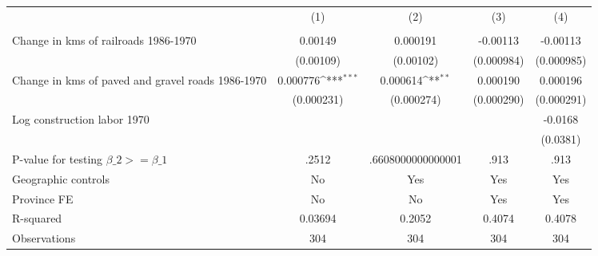 {
\def\sym#1{\ifmmode^{#1}\else\(^{#1}\)\fi}
\begin{tabular}{l*{4}{c}}
\hline\hline
                &\multicolumn{1}{c}{(1)}&\multicolumn{1}{c}{(2)}&\multicolumn{1}{c}{(3)}&\multicolumn{1}{c}{(4)}\\
                &\multicolumn{1}{c}{}&\multicolumn{1}{c}{}&\multicolumn{1}{c}{}&\multicolumn{1}{c}{}\\
\hline
Change in kms of railroads 1986-1970&  0.00149         & 0.000191         & -0.00113         & -0.00113         \\
                &(0.00109)         &(0.00102)         &(0.000984)         &(0.000985)         \\
[1em]
Change in kms of paved and gravel roads 1986-1970& 0.000776\sym{***}& 0.000614\sym{**} & 0.000190         & 0.000196         \\
                &(0.000231)         &(0.000274)         &(0.000290)         &(0.000291)         \\
[1em]
Log construction labor 1970&                  &                  &                  &  -0.0168         \\
                &                  &                  &                  & (0.0381)         \\
\hline
P-value for testing $\beta\_{2} >= \beta\_{1}$&    .2512         &.6608000000000001         &     .913         &     .913         \\
Geographic controls&       No         &      Yes         &      Yes         &      Yes         \\
Province FE     &       No         &       No         &      Yes         &      Yes         \\
R-squared       &  0.03694         &   0.2052         &   0.4074         &   0.4078         \\
Observations    &      304         &      304         &      304         &      304         \\
\hline\hline
\end{tabular}
}
